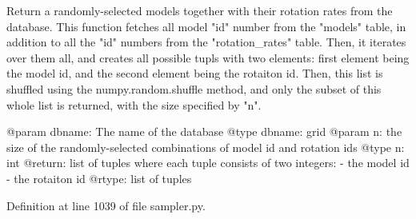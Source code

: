 \begin{DoxyVerb}Return a randomly-selected models together with their rotation rates from the database.
This function fetches all model "id" number from the "models" table, in addition to all the "id"
numbers from the "rotation_rates" table. Then, it iterates over them all, and creates all possible
tupls with two elements: first element being the model id, and the second element being the rotaiton
id. Then, this list is shuffled using the numpy.random.shuffle method, and only the subset of this
whole list is returned, with the size specified by "n".

@param dbname: The name of the database
@type dbname: grid
@param n: the size of the randomly-selected combinations of model id and rotation ids
@type n: int
@return: list of tuples where each tuple consists of two integers: 
   - the model id
   - the rotaiton id
@rtype: list of tuples
\end{DoxyVerb}
 

Definition at line 1039 of file sampler.\+py.

